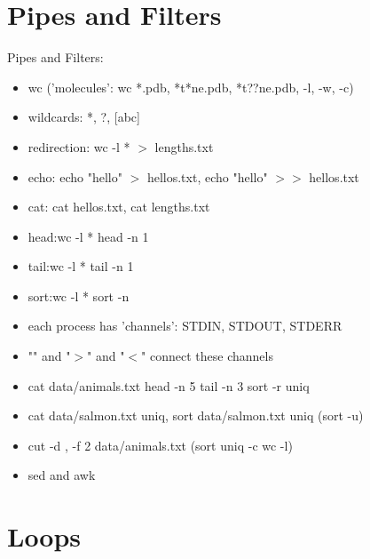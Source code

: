 \documentclass[
 size=12pt,
 paper=screen,
 mode=present,
 display=slidesnotes,
 style=paintings,
 nohandoutpagebreaks,
]{powerdot}
\begin{document}
\section[slide=false]{Pipes and Filters}

\begin{slide}{Pipes and Filters:}
  \begin{itemize}
    \begingroup
    \fontsize{8}{8}\selectfont
     \item wc ('molecules': wc *.pdb, *t*ne.pdb, *t??ne.pdb, -l, -w, -c)
     \item wildcards: *, ?, [abc]
     \item redirection: wc -l * $>$ lengths.txt
     \item echo: echo "hello" $>$ hellos.txt, echo "hello" $>$$>$ hellos.txt
     \item cat: cat hellos.txt, cat lengths.txt
     \item head:wc -l * \textbar head -n 1
     \item tail:wc -l * \textbar tail -n 1
     \item sort:wc -l * \textbar sort -n
     \item each process has 'channels': STDIN, STDOUT, STDERR
     \item "\textbar" and "$>$" and "$<$" connect these channels
     \item cat data/animals.txt \textbar head -n 5 \textbar tail -n 3 \textbar sort -r \textbar uniq
     \item cat data/salmon.txt \textbar uniq, sort data/salmon.txt \textbar uniq (sort -u)
     \item cut -d , -f 2 data/animals.txt (\textbar sort \textbar uniq -c \textbar wc -l)
     \item sed and awk
    \endgroup
  \end{itemize}
\end{slide}

\section[slide=false]{Loops}
\end{document}

